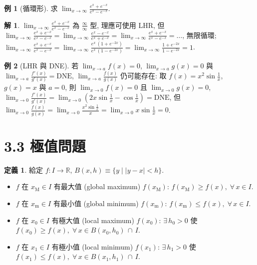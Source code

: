 \documentclass[12pt]{extarticle}
\newcommand{\ds}{\displaystyle}
\theoremstyle{definition}
\newtheorem*{dfn}{定義}
\newtheorem*{ex}{例}
\newtheorem*{sol}{解}
\begin{document}
\begin{ex}[循環形]
  求 $\ds\lim_{x\to\infty}\frac{e^x + e^{-x}}{e^x - e^{-x}}$. 
\end{ex}

\begin{sol}
  $\ds\lim_{x\to\infty}\frac{e^x + e^{-x}}{e^x - e^{-x}}$ 為 $\frac{\infty}{\infty}$ 型, 理應可使用 LHR, 但 $\ds\lim_{x\to\infty}\frac{e^x + e^{-x}}{e^x - e^{-x}} = \ds\lim_{x\to\infty}\frac{e^x - e^{-x}}{e^x + e^{-x}} = \lim_{x\to\infty}\frac{e^x + e^{-x}}{e^x - e^{-x}} = \ldots$, 無限循環; $\ds\lim_{x\to\infty}\frac{e^x + e^{-x}}{e^x - e^{-x}} = \lim_{x\to\infty}\frac{e^x\,(1 + e^{-2x})}{e^x\,(1 - e^{-2x})} = \lim_{x\to\infty}\frac{1 + e^{-2x}}{1 - e^{-2x}} = 1$. 
\end{sol}

\begin{ex}[LHR 與 DNE]
  若 $\ds\lim_{x\to a}f(x) = 0$, $\ds\lim_{x\to a}g(x) = 0$ 與 $\ds\lim_{x\to a}\frac{f'(x)}{g'(x)} = \text{DNE}$, $\ds\lim_{x\to a}\frac{f(x)}{g(x)}$ 仍可能存在: 取 $\ds f(x) = x^2\sin\frac{1}{x}$, $g(x)= x$ 與 $a = 0$, 則 $\ds\lim_{x\to 0} f(x) = 0$ 且 $\ds\lim_{x\to 0} g(x) = 0$, $\ds\lim_{x\to 0}\frac{f'(x)}{g'(x)} = \lim_{x\to 0}\left(2x\sin\frac{1}{x} -\cos\frac{1}{x}\right) = \text{DNE}$, 但 $\ds\lim_{x\to 0}\frac{f(x)}{g(x)} = \lim_{x\to 0}\frac{x^2\sin\frac{1}{x}}{x} = \lim_{x\to 0} x\sin\frac{1}{x}= 0$. 
\end{ex}

\section*{3.3 極值問題}

\begin{dfn}
  給定 $f:I\to\mathbb{R}$, $\ds B(x, h)\equiv\{y\;|\;|y - x| < h\}$. 
  \begin{itemize}\setlength\itemsep{0em}
    \item $f$ 在 $\ds x_\text{M}\in I$ 有最大值 (global maximum) $\ds f(x_\text{M})$: $\ds f(x_\text{M})\geqslant f(x),\;\forall\,x\in I$. 
    \item $f$ 在 $\ds x_\text{m}\in I$ 有最小值 (global minimum) $\ds f(x_\text{m})$: $\ds f(x_\text{m})\leqslant f(x),\;\forall\,x\in I$. 
    \item $f$ 在 $\ds x_0\in I$ 有極大值 (local maximum) $\ds f(x_0)$: $\ds\exists\,h_0 > 0$ 使 $\ds f(x_0)\geqslant f(x),\;\forall\,x\in B(x_0, h_0)\,\cap\,I$. 
    \item $f$ 在 $\ds x_1\in I$ 有極小值 (local minimum) $\ds f(x_1)$: $\ds\exists\,h_1 > 0$ 使 $\ds f(x_1)\leqslant f(x),\;\forall\,x\in B(x_1, h_1)\,\cap\,I$. 
  \end{itemize}
\end{dfn}
\end{document}
